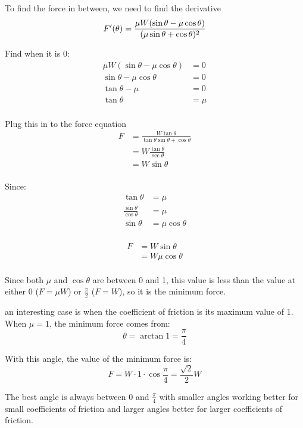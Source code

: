 \documentclass[letterpaper]{exam}
\begin{document}
\begin{description}
      To find the force in between, we need to find the derivative
      \[
        F'(\theta) = \frac{\mu  W (\sin \theta - \mu \cos \theta)}
                          {(\mu \sin \theta + \cos \theta)^2} \\
      \]

      Find when it is 0:
      \begin{align*}
        \mu  W (\sin \theta - \mu \cos \theta) & = 0 \\
        \sin \theta - \mu \cos \theta          & = 0 \\
        \tan \theta - \mu                      & = 0 \\
        \tan \theta                            & = \mu \\
      \end{align*}

      Plug this in to the force equation
      \begin{align*}
        F & = \frac{W \tan \theta}{\tan \theta \sin \theta + \cos \theta} \\
          & = W \frac{\tan \theta}{\sec \theta} \\
          & = W \sin \theta \\
      \end{align*}

      Since:
      \begin{align*}
        \tan \theta                     & = \mu \\
        \frac{\sin \theta}{\cos \theta} & = \mu \\
        \sin \theta                     & = \mu \cos \theta \\
      \end{align*}
      
      \begin{align*}
        F & = W \sin \theta \\
          & = W \mu \cos \theta \\
      \end{align*}

      Since both $\mu$ and $\cos \theta$ are between 0 and 1, this value is less than the value at
      either $0$ ($F = \mu W$) or $\frac{\pi}{2}$ ($F = W$), so it is the minimum force.

      an interesting case is when the coefficient of friction is its maximum value of 1. When $\mu =
      1$, the minimum force comes from:
      \[
        \theta = \arctan 1 = \frac{\pi}{4}
      \]
      
      With this angle, the value of the minimum force is:
      \[
        F = W \cdot 1 \cdot \cos \frac{\pi}{4} = \frac{\sqrt{2}}{2} W
      \]

      The best angle is always between $0$ and $\frac{\pi}{4}$ with smaller angles working better
      for small coefficients of friction and larger angles better for larger coefficients of
      friction.

  \end{description}
\end{document}
